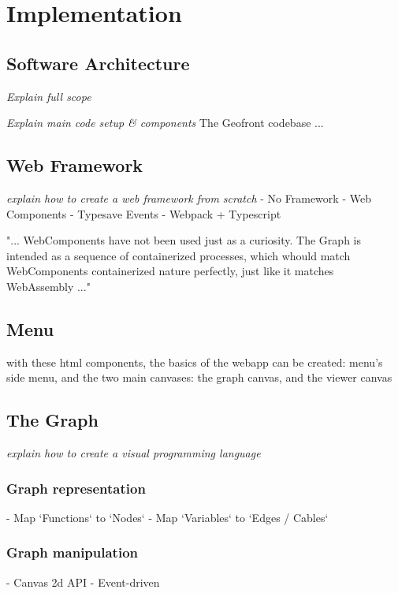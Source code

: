 \chapter{Implementation}%

\section{Software Architecture}

\emph{Explain full scope}


\emph{Explain main code setup \& components}
The Geofront codebase ...

\section{Web Framework}
\emph{explain how to create a web framework from scratch}
- No Framework
- Web Components
- Typesave Events
- Webpack + Typescript

"...
WebComponents have not been used just as a curiosity. 
The Graph is intended as a sequence of containerized processes, which whould match WebComponents containerized nature perfectly, just like it matches WebAssembly
..."


\section{Menu}
with these html components, the basics of the webapp can be created: menu's side menu, and the two main canvases: the graph canvas, and the viewer canvas 

\section{The Graph}
\emph{explain how to create a visual programming language}
\subsection*{Graph representation}
  - Map `Functions` to `Nodes` 
  - Map `Variables` to `Edges / Cables`
\subsection*{Graph manipulation}
  - Canvas 2d API
  - Event-driven
